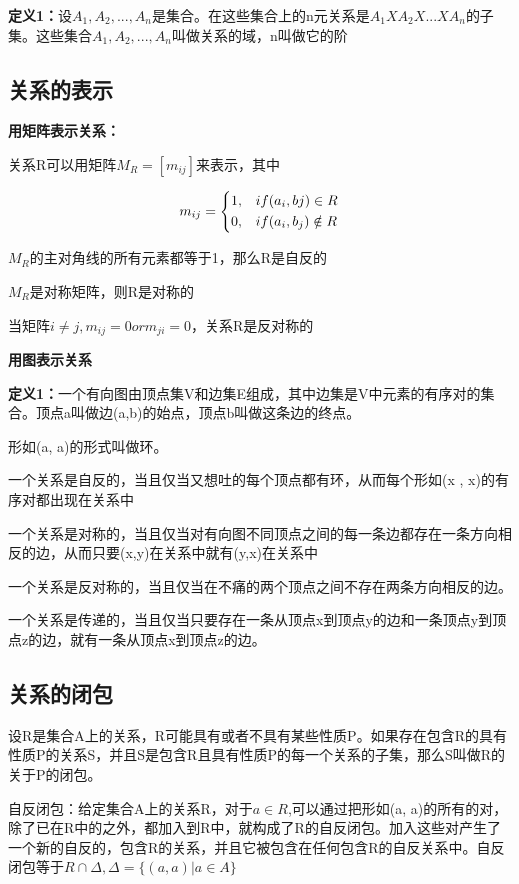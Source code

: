 \documentclass{ctexart}
\begin{document}
	\textbf{定义1：}设\(A_1,A_2,...,A_n\)是集合。在这些集合上的n元关系是\(A_1 X A_2 X...X A_n\)的子集。这些集合\(A_1,A_2,...,A_n\)叫做关系的域，n叫做它的阶
	
	\subsection{关系的表示}
	
	\textbf{用矩阵表示关系：}
	
	关系R可以用矩阵\(M_R = [m_{ij}]\)来表示，其中
	
	\[m_{ij} = 
	\begin{dcases}
	1,  & if (a_i, bj)\in R \\
	0, & if (a_i, b_j) \notin R
	\end{dcases}\]
	
	\(M_R\)的主对角线的所有元素都等于1，那么R是自反的
	
	\(M_R\)是对称矩阵，则R是对称的
	
	当矩阵\(i \neq j, m_{ij}=0 or m_{ji} = 0\)，关系R是反对称的
	
	\textbf{用图表示关系}
	
	\textbf{定义1：}一个有向图由顶点集V和边集E组成，其中边集是V中元素的有序对的集合。顶点a叫做边(a,b)的始点，顶点b叫做这条边的终点。
	
	形如(a, a)的形式叫做环。
	
	一个关系是自反的，当且仅当又想吐的每个顶点都有环，从而每个形如(x , x)的有序对都出现在关系中
	
	一个关系是对称的，当且仅当对有向图不同顶点之间的每一条边都存在一条方向相反的边，从而只要(x,y)在关系中就有(y,x)在关系中
	
	一个关系是反对称的，当且仅当在不痛的两个顶点之间不存在两条方向相反的边。
	
	一个关系是传递的，当且仅当只要存在一条从顶点x到顶点y的边和一条顶点y到顶点z的边，就有一条从顶点x到顶点z的边。
	
	\subsection{关系的闭包}
	
	设R是集合A上的关系，R可能具有或者不具有某些性质P。如果存在包含R的具有性质P的关系S，并且S是包含R且具有性质P的每一个关系的子集，那么S叫做R的关于P的闭包。
	
	自反闭包：给定集合A上的关系R，对于\(a \in R\),可以通过把形如(a, a)的所有的对，除了已在R中的之外，都加入到R中，就构成了R的自反闭包。加入这些对产生了一个新的自反的，包含R的关系，并且它被包含在任何包含R的自反关系中。自反闭包等于\(R \cap \Delta, \Delta = \{(a, a)|a\in A\}\)
	
	
	
	
	
	
	
	
	
	
	
	
	
	
	
	
	
	
	
	
	
	
\end{document}
